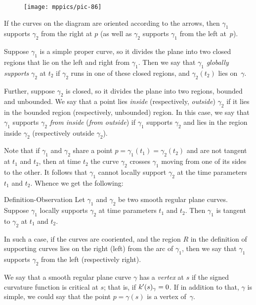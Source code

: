 \begin{wrapfigure}[8]{o}{43 mm}
\vskip-3mm
\centering
\texttt{[image: mppics/pic-86]}
\vskip0mm
\end{wrapfigure}

If the curves on the diagram are oriented according to the arrows, then $\gamma_1$ supports $\gamma_2$ from the right at $p$ (as well as $\gamma_2$ supports $\gamma_1$ from the left at~$p$).

Suppose $\gamma_1$ is a simple proper curve, so it divides the plane into two closed regions that lie on the left and right from $\gamma_1$.
Then we say that $\gamma_1$ \emph{globally supports} $\gamma_2$ at $t_2$ 
if $\gamma_2$ runs in one of these closed regions, and 
$\gamma_2(t_2)$ lies on~$\gamma$.

Further, suppose $\gamma_2$ is closed, so it divides the plane into two regions, bounded and unbounded.
We say that a point lies {}\emph{inside} (respectively, {}\emph{outside}) $\gamma_2$ if it lies in the bounded region (respectively, unbounded) region.
In this case, we say that $\gamma_1$ supports $\gamma_2$ \emph{from inside} (\emph{from outside}) if $\gamma_1$ supports $\gamma_2$ and lies in the region inside $\gamma_2$ (respectively outside $\gamma_2$). 

Note that if $\gamma_1$ and $\gamma_2$ share a point $p=\gamma_1(t_1)=\gamma_2(t_2)$ and are not tangent at $t_1$ and $t_2$, then at time $t_2$ the curve $\gamma_2$ crosses $\gamma_1$  moving from one of its sides to the other.
It follows that $\gamma_1$ cannot locally support $\gamma_2$ at the time parameters $t_1$ and $t_2$.
Whence we get the following:

\begin{thm}{Definition-Observation}
Let $\gamma_1$ and $\gamma_2$ be two smooth regular plane curves.
Suppose $\gamma_1$ locally supports $\gamma_2$ at time parameters $t_1$ and $t_2$.
Then $\gamma_1$ is tangent to $\gamma_2$ at $t_1$ and $t_2$.

In such a case, if the curves are cooriented, and the region $R$ in the definition of supporting curves lies on the right (left) from the arc of $\gamma_1$, then we say that 
$\gamma_1$ supports $\gamma_2$ from the left (respectively right).
\end{thm}

We say that a smooth regular plane curve $\gamma$ has a \emph{vertex} at $s$
if the signed curvature function is critical at $s$;
that is, if $k'(s)_\gamma=0$.
If in addition to that, $\gamma$ is simple, we could say that the point $p=\gamma(s)$ is a vertex of~$\gamma$.

